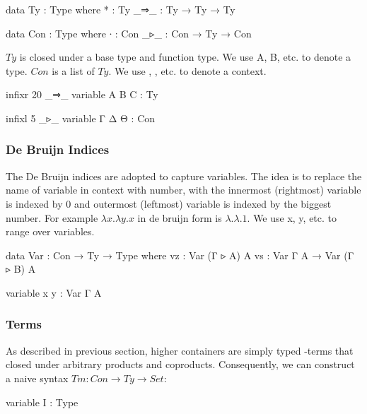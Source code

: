 \begin{code}
data Ty : Type where
  * : Ty
  _⇒_ : Ty → Ty → Ty

data Con : Type where
  ∙   : Con
  _▹_ : Con → Ty → Con
\end{code}

$Ty$ is closed under a base type and function type. We use A, B, etc. to denote a type. $Con$ is a list of $Ty$. We use \Gamma, \Delta, etc. to denote a context.

\begin{code}[hide]
infixr 20 _⇒_
variable A B C : Ty

infixl 5 _▹_
variable Γ Δ Θ : Con
\end{code}

\subsubsection*{De Bruijn Indices}

The De Bruijn indices are adopted to capture variables. The idea is to replace the name of variable in context with number, with the innermost (rightmost) variable is indexed by 0 and outermost (leftmost) variable is indexed by the biggest number. For example $\lambda x.\lambda y.x$ in de bruijn form is $\lambda.\lambda.1$. We use x, y, etc. to range over variables.

\begin{code}
data Var : Con → Ty → Type where
  vz : Var (Γ ▹ A) A
  vs : Var Γ A → Var (Γ ▹ B) A
\end{code}

\begin{code}[hide]
variable x y : Var Γ A
\end{code}

\subsubsection*{Terms}

As described in previous section, higher containers are simply typed \lambda-terms that closed under arbitrary products and coproducts. Consequently, we can construct a naive syntax $Tm : Con \to Ty \to Set$:

\begin{code}[hide]
variable I : Type
\end{code}


